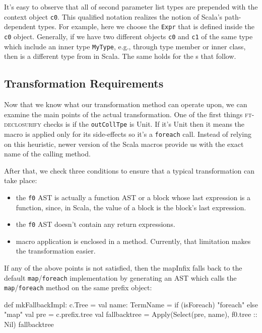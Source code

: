 It's easy to observe that all of second parameter list types are prepended
with the context object \texttt{c0}. This qualified notation realizes the notion of
Scala's path-dependent types. For example, here we choose the \texttt{Expr} that is
defined inside the \texttt{c0} object. Generally, if we have two different objects \texttt{c0} and
\texttt{c1} of the same type which include an inner type \texttt{MyType}, e.g., through type
member or inner class,  then  is a different type from  in
Scala. The same holds for the s that follow.


\subsection{Transformation Requirements}

Now that we know what our transformation method can operate upon, we can examine the
main points of the actual transformation. One of the first things \textsc{ft-declosurify}
checks is if the \texttt{outCollTpe} is Unit. If it's Unit then
it means the macro is applied only for its side-effects so it's a \texttt{foreach} call.
Instead of relying on this heuristic, newer version of the Scala macros provide
us with the exact name of the calling method.

After that, we check three conditions to ensure that a typical
transformation can take place:
\begin{itemize}
 \item
  the \texttt{f0} AST is actually a function AST or a block whose last
expression is a function, since, in Scala, the value of a block is the block's
last expression.
 \item
    the \texttt{f0} AST doesn't contain any return expressions.
 \item
    macro application is enclosed in a method. Currently, that limitation makes
the transformation easier.
\end{itemize}

If any of the above points is not satisfied, then the mapInfix falls back to the
default \texttt{map}/\texttt{foreach} implementation by generating an AST which
calls the \texttt{map}/\texttt{foreach} method on the same prefix object:

\begin{scalaCode}
def mkFallbackImpl: c.Tree = {
  val name: TermName = if (isForeach) "foreach" else "map"
  val pre = c.prefix.tree
  val fallbacktree = Apply(Select(pre, name), f0.tree :: Nil)
  fallbacktree
}
\end{scalaCode}


